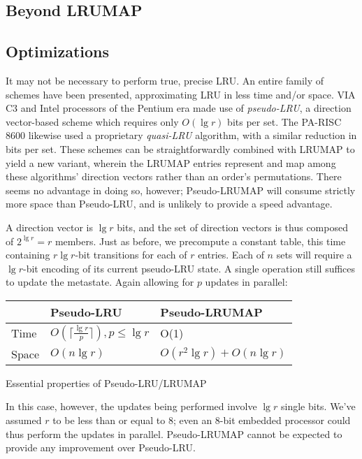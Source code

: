\documentclass[letterpaper,10pt]{article}
\makeatletter
\newenvironment{tablehere}
{\def\@captype{table}}
{}
\makeatother
\begin{document}
\begin{multicols}{2}
\section{Beyond LRUMAP}
\subsection{Optimizations}
It may not be necessary to perform true, precise LRU. An entire family of
schemes have been presented, approximating LRU in less time and/or space.
VIA C3\textsuperscript{\textregistered} and Intel processors of the Pentium\textsuperscript{\textregistered} era\cite{shanley} made use of
\textit{pseudo-LRU}, a direction vector-based scheme which requires only
$O(\lg{r})$ bits per set\cite{handy}. The PA-RISC 8600\cite{hurd} likewise used
a proprietary \textit{quasi-LRU} algorithm, with a similar reduction in bits
per set. These schemes can be straightforwardly combined with LRUMAP to yield a
new variant, wherein the LRUMAP entries represent and map among these
algorithms' direction vectors rather than an order's permutations. There seems
no advantage in doing so, however; Pseudo-LRUMAP will consume strictly more space
than Pseudo-LRU, and is unlikely to provide a speed advantage.

A direction vector is $\lg{r}$ bits, and the set of direction vectors is thus
composed of $2^{\lg{r}}=r$ members. Just as before, we precompute a constant
table, this time containing $r \lg{r}$-bit transitions for each of $r$
entries. Each of $n$ sets will require a $\lg{r}$-bit encoding of its current
pseudo-LRU state. A single operation still suffices to update the metastate.
Again allowing for $p$ updates in parallel:
\begin{center}
\begin{tablehere}
	\begin{tabular}{|l|l|l|}
	\hline
	& Pseudo-LRU & Pseudo-LRUMAP \\
	\hline
	Time & $O(\lceil\frac{\lg{r}}{p}\rceil), {p}\le{\lg{r}}$ & O(1) \\
	\hline
	Space & $O(n\lg{r})$ & $O(r^{2}\lg{r}) + O(n\lg{r})$ \\
	\hline
	\end{tabular}
	\caption{Essential properties of Pseudo-LRU/LRUMAP}
	\label{tab:pseudolru}
\end{tablehere}
\end{center}
In this case, however, the updates being performed involve $\lg{r}$ single bits.
We've assumed $r$ to be less than or equal to 8; even an 8-bit embedded processor
could thus perform the updates in parallel. Pseudo-LRUMAP cannot be expected to
provide any improvement over Pseudo-LRU.

\end{multicols}
\end{document}
